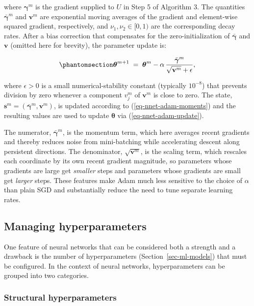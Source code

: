 \documentclass[
  letterpaper,
  krantz2]{style/krantz}
\begin{document}
where \(\boldsymbol{\gamma}^{m}\) is the gradient supplied to \(U\) in
Step 5 of Algorithm 3. The quantities \(\bar{\boldsymbol{\gamma}}^{m}\)
and \(\mathbf{v}^{m}\) are exponential moving averages of the gradient
and element-wise squared gradient, respectively, and
\(\nu_1, \nu_2 \in [0, 1)\) are the corresponding decay rates. After a
bias correction that compensates for the zero-initialization of
\(\bar{\boldsymbol{\gamma}}\) and \(\mathbf{v}\) (omitted here for
brevity), the parameter update is:

\begin{equation}\phantomsection\label{eq-nnet-adam-update}{
\boldsymbol{\theta}^{m+1} \;=\; \boldsymbol{\theta}^{m} - \alpha\,\frac{\bar{\boldsymbol{\gamma}}^{m}}{\sqrt{\mathbf{v}^{m}} + \epsilon},
}\end{equation}

where \(\epsilon > 0\) is a small numerical-stability constant
(typically \(10^{-8}\)) that prevents division by zero whenever a
component \(v_j^{m}\) of \(\mathbf{v}^{m}\) is close to zero. The state,
\(\mathbf{s}^m = (\bar{\boldsymbol{\gamma}}^m, \mathbf{v}^m)\), is
updated according to (\ref{eq-nnet-adam-moments}) and the resulting
values are used to update \(\boldsymbol{\theta}\) via
(\ref{eq-nnet-adam-update}).

The numerator, \(\bar{\boldsymbol{\gamma}}^{m}\), is the momentum term,
which here averages recent gradients and thereby reduces noise from
mini-batching while accelerating descent along persistent directions.
The denominator, \(\sqrt{\mathbf{v}^{m}}\), is the scaling term, which
rescales each coordinate by its own recent gradient magnitude, so
parameters whose gradients are large get \emph{smaller} steps and
parameters whose gradients are small get \emph{larger} steps. These
features make Adam much less sensitive to the choice of \(\alpha\) than
plain SGD and substantially reduce the need to tune separate learning
rates.

\subsection{Managing hyperparameters}\label{sec-nnet-hyperparameters}

One feature of neural networks that can be considered both a strength
and a drawback is the number of hyperparameters
(Section~\ref{sec-ml-models}) that must be configured. In the context of
neural networks, hyperparameters can be grouped into two categories.

\subsubsection{Structural
hyperparameters}\label{structural-hyperparameters}
\end{document}
